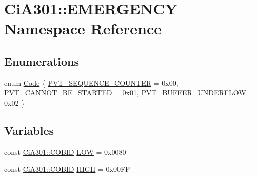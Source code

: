 \hypertarget{namespace_ci_a301_1_1_e_m_e_r_g_e_n_c_y}{\section{Ci\-A301\-:\-:E\-M\-E\-R\-G\-E\-N\-C\-Y Namespace Reference}
\label{namespace_ci_a301_1_1_e_m_e_r_g_e_n_c_y}
}
\subsection*{Enumerations}
\begin{DoxyCompactItemize}
\item 
enum \hyperlink{namespace_ci_a301_1_1_e_m_e_r_g_e_n_c_y_a5b4233d92eee286424fe45b52afacc07}{Code} \{ \hyperlink{namespace_ci_a301_1_1_e_m_e_r_g_e_n_c_y_a5b4233d92eee286424fe45b52afacc07a28bb6722b9ae61878560a1ac3e575a68}{P\-V\-T\-\_\-\-S\-E\-Q\-U\-E\-N\-C\-E\-\_\-\-C\-O\-U\-N\-T\-E\-R} = 0x00, 
\hyperlink{namespace_ci_a301_1_1_e_m_e_r_g_e_n_c_y_a5b4233d92eee286424fe45b52afacc07a9d86b6c21a4899ab88021df322cd3786}{P\-V\-T\-\_\-\-C\-A\-N\-N\-O\-T\-\_\-\-B\-E\-\_\-\-S\-T\-A\-R\-T\-E\-D} = 0x01, 
\hyperlink{namespace_ci_a301_1_1_e_m_e_r_g_e_n_c_y_a5b4233d92eee286424fe45b52afacc07a1ece25e44a861df72fe9ea22e1b1e0a3}{P\-V\-T\-\_\-\-B\-U\-F\-F\-E\-R\-\_\-\-U\-N\-D\-E\-R\-F\-L\-O\-W} = 0x02
 \}
\end{DoxyCompactItemize}
\subsection*{Variables}
\begin{DoxyCompactItemize}
\item 
const \hyperlink{namespace_ci_a301_aec5b5dbb2b60d2837c60499f6f297aa7}{Ci\-A301\-::\-C\-O\-B\-I\-D} \hyperlink{namespace_ci_a301_1_1_e_m_e_r_g_e_n_c_y_afd634e483d0eedb29789234d50cb6895}{L\-O\-W} = 0x0080
\item 
const \hyperlink{namespace_ci_a301_aec5b5dbb2b60d2837c60499f6f297aa7}{Ci\-A301\-::\-C\-O\-B\-I\-D} \hyperlink{namespace_ci_a301_1_1_e_m_e_r_g_e_n_c_y_a86da6584e2722e7e1b2c0fc763c06754}{H\-I\-G\-H} = 0x00\-F\-F
\end{DoxyCompactItemize}


